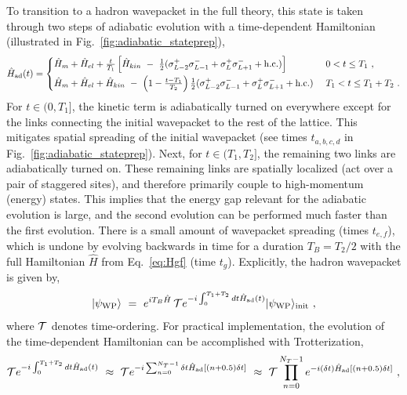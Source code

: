 \documentclass[aps, prc, tightenlines,superscriptaddress, letterpaper, amsmath, amssymb, preprintnumbers, floatfix, longbibliography, nofootinbib]{revtex4-2}
\begin{document}
%
To transition to a hadron wavepacket in the full theory, this state is taken through two steps of adiabatic evolution with a time-dependent Hamiltonian (illustrated in Fig.~\ref{fig:adiabatic_stateprep}),
%
\begin{equation}
    \hat{H}_{\rm ad}(t) = 
    \begin{cases}
    \hat{H}_m + \hat{H}_{el} + \frac{t}{T_1} \left [ \hat{H}_{kin} \ - \ \frac{1}{2} (\sigma^+_{L-2}\sigma^-_{L-1} + \sigma^+_{L}\sigma^-_{L+1} + {\rm h.c.} ) \right ]  \ &0<t\leq T_1  \ , \\[5pt]
    \hat{H}_m + \hat{H}_{el} + \hat{H}_{kin} \ - \ \left (1-\frac{t-T_1}{T_2} \right ) \frac{1}{2} (\sigma^+_{L-2}\sigma^-_{L-1} + \sigma^+_{L}\sigma^-_{L+1} + {\rm h.c.} )   \ &T_1<t\leq T_1+T_2  \ . 
    \end{cases}
\end{equation}
%
For $t\in (0,T_1 ]$, the kinetic term is adiabatically turned on everywhere except for the links connecting the initial wavepacket to the rest of the lattice.
This mitigates spatial spreading of the initial wavepacket (see times $t_{a,b,c,d}$ in Fig.~\ref{fig:adiabatic_stateprep}).
Next, for $t\in (T_1,T_2 ]$, the remaining two links are adiabatically turned on. 
These remaining links are spatially localized (act over a pair of staggered sites), and therefore primarily couple to high-momentum (energy) states.
This implies that the energy gap relevant for the adiabatic evolution is large, and the second evolution can be performed much faster than the first evolution.
There is a small amount of wavepacket spreading (times $t_{e,f}$), which is undone by evolving backwards in time for a duration $T_B = T_2/2$ with the full Hamiltonian $\hat{H}$ from Eq.~\eqref{eq:Hgf} (time $t_g$).
Explicitly, the hadron wavepacket is given by,
%
\begin{equation}
\vert \psi_{{\rm WP}} \rangle \ = \  
 e^{i T_B \hat{H}} \, {\cal T} e^{-i \int_{0}^{T_1 + T_2}dt \hat{H}_{\rm ad}(t)} \vert \psi_{{\rm WP}}\rangle_{\text{init}} \ ,
\label{eq:adiabaticWP}
\end{equation}
%
where ${\cal T}$ denotes time-ordering.
For practical implementation, the evolution of the time-dependent Hamiltonian can be accomplished with Trotterization,
%
\begin{equation}
{\cal T} e^{-i \int_{0}^{T_1 + T_2}dt \hat{H}_{\rm ad}(t)} \ \approx \ {\cal T} e^{-i \sum_{n=0}^{N_T-1} \delta t \hat{H}_{\rm ad}\left [(n+0.5) \delta t\right ]} \ \approx \ {\cal T} 
 \prod_{n=0}^{N_T-1}e^{-i \left (\delta t \right ) \hat{H}_{\rm ad}\left [(n+0.5) \delta t\right ]} \ ,
\end{equation}
\end{document}
